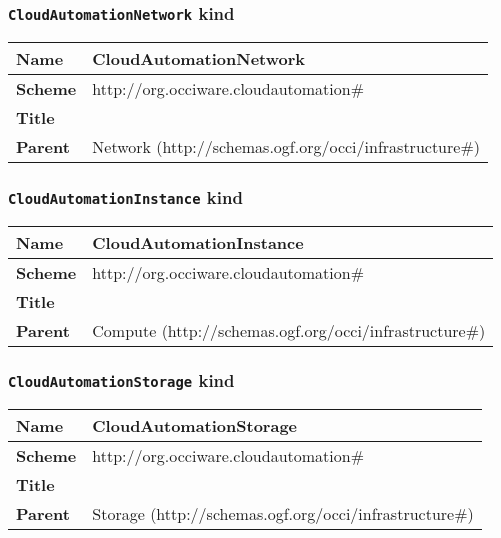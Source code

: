\subsubsection{\texttt{CloudAutomationNetwork} kind}
\begin{center}
\begin{tabular}{|l|l|}
  \hline
  \textbf{Name} & CloudAutomationNetwork \\
  \hline  
  \textbf{Scheme} & http://org.occiware.cloudautomation\# \\
  \hline
  \textbf{Title} &  \\
  \hline
  \textbf{Parent} & Network (http://schemas.ogf.org/occi/infrastructure\#) \\
  \hline
\end{tabular}
\end{center}



\subsubsection{\texttt{CloudAutomationInstance} kind}
\begin{center}
\begin{tabular}{|l|l|}
  \hline
  \textbf{Name} & CloudAutomationInstance \\
  \hline  
  \textbf{Scheme} & http://org.occiware.cloudautomation\# \\
  \hline
  \textbf{Title} &  \\
  \hline
  \textbf{Parent} & Compute (http://schemas.ogf.org/occi/infrastructure\#) \\
  \hline
\end{tabular}
\end{center}



\subsubsection{\texttt{CloudAutomationStorage} kind}
\begin{center}
\begin{tabular}{|l|l|}
  \hline
  \textbf{Name} & CloudAutomationStorage \\
  \hline  
  \textbf{Scheme} & http://org.occiware.cloudautomation\# \\
  \hline
  \textbf{Title} &  \\
  \hline
  \textbf{Parent} & Storage (http://schemas.ogf.org/occi/infrastructure\#) \\
  \hline
\end{tabular}
\end{center}



